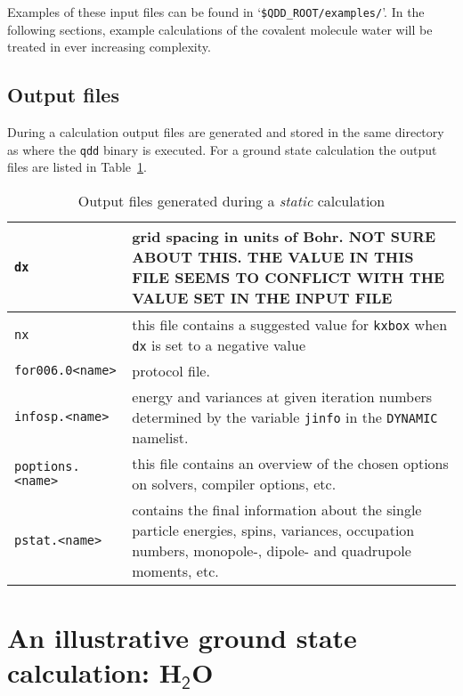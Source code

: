 \documentclass[11pt,a4paper]{article}
\begin{document}
		Examples of these input files can be found in `\texttt{\$QDD\_ROOT/examples/}'. In the following sections, example calculations of the covalent molecule water will be treated in ever increasing complexity.
			
		\subsection{Output files}
			During a calculation output files are generated and stored in the same directory as where the \texttt{qdd} binary is executed. For a ground state calculation the output files are listed in Table~\ref{tab:static-output-files}.
			\begin{table}[t]
				\caption{Output files generated during a \emph{static} calculation}\label{tab:static-output-files}
				\begin{tabular}{|p{3.5cm}|p{11.2cm}|}
					\hline
					\texttt{dx}& grid spacing in units of Bohr. \uppercase{not sure about this. the value in this file seems to conflict with the value set in the input file} \\
					\hline
					\texttt{nx}& this file contains a suggested value for \texttt{kxbox} when \texttt{dx} is set to a negative value\\
					\hline
					\texttt{for006.0<name>}& protocol file.\\
					\hline
					\texttt{infosp.<name>}& energy and variances at given iteration numbers determined by the variable \texttt{jinfo} in the \texttt{DYNAMIC} namelist.\\
					\hline
					\texttt{poptions.<name>}& this file contains an overview of the chosen options on solvers, compiler options, etc.\\
					\hline
					\texttt{pstat.<name>}& contains the final information about the single particle energies, spins, variances, occupation numbers, monopole-, dipole- and quadrupole moments, etc.\\
					\hline
				\end{tabular}
			\end{table}
		
	\section{An illustrative ground state calculation: H$_\mathsf{2}$O}
			
\end{document}
